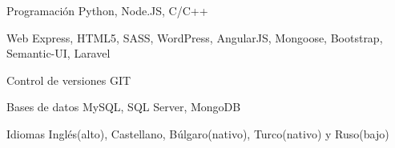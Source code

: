 

\begin{cvskills}

  \cvskill
    {Programación} %
    {Python, Node.JS, C/C++} %

  \cvskill
    {Web} %
    {Express, HTML5, SASS, WordPress, AngularJS, Mongoose, Bootstrap, Semantic-UI, Laravel} %

\cvskill
    {Control de versiones} %
    {GIT} %

  \cvskill
    {Bases de datos} %
    {MySQL, SQL Server, MongoDB} %

  \cvskill
    {Idiomas} %
    {Inglés(alto), Castellano, Búlgaro(nativo), Turco(nativo) y Ruso(bajo)} %

\end{cvskills}
